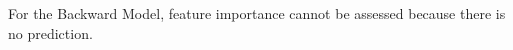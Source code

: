 For the Backward Model, feature importance cannot be assessed because there is no prediction.


%
%

